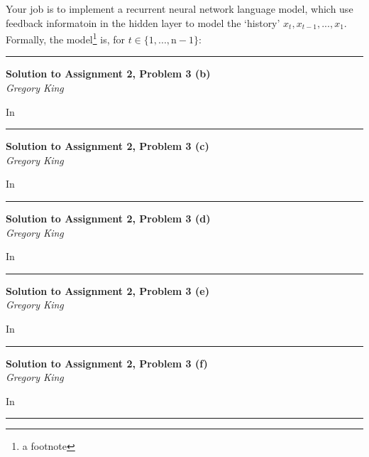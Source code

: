 \documentclass[letter,12pt]{article}
\newcommand{\myhwtitle}[3]
{\begin{center}
{\large {\bf Solution to Assignment {#1}, Problem {#2}}}\\
\medskip 
{\it {#3}} %
\end{center}}
\begin{document}
Your job is to implement a recurrent neural network language model, which use feedback informatoin in the hidden layer to model the `history' $x_{t}, x_{t-1}, ..., x_{1}$. Formally, the model\footnote{a footnote} is, for $t\in\{1,...,\textrm{n}-1\}$:

\vspace{5mm}
\noindent\rule{\textwidth}{0.4pt}

\clearpage

\myhwtitle{2}{3 (b)}{Gregory King}

\bigskip

\noindent In

\vspace{5mm}
\noindent\rule{\textwidth}{0.4pt}

\clearpage

\myhwtitle{2}{3 (c)}{Gregory King}

\bigskip

\noindent In

\vspace{5mm}
\noindent\rule{\textwidth}{0.4pt}

\clearpage

\myhwtitle{2}{3 (d)}{Gregory King}

\bigskip

\noindent In

\vspace{5mm}
\noindent\rule{\textwidth}{0.4pt}

\clearpage

\myhwtitle{2}{3 (e)}{Gregory King}

\bigskip

\noindent In

\vspace{5mm}
\noindent\rule{\textwidth}{0.4pt}

\clearpage

\myhwtitle{2}{3 (f)}{Gregory King}

\bigskip

\noindent In

\vspace{5mm}
\noindent\rule{\textwidth}{0.4pt}

\clearpage
\end{document}
